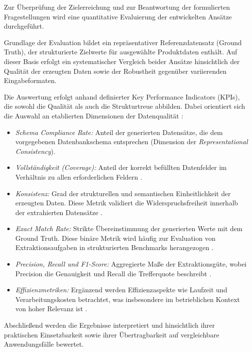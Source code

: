 Zur Überprüfung der Zielerreichung und zur Beantwortung der formulierten Fragestellungen wird eine quantitative Evaluierung der entwickelten Ansätze durchgeführt. 

Grundlage der Evaluation bildet ein repräsentativer Referenzdatensatz (Ground Truth), der strukturierte Zielwerte für ausgewählte Produktdaten enthält. Auf dieser Basis erfolgt 
ein systematischer Vergleich beider Ansätze hinsichtlich der Qualität der erzeugten Daten sowie der Robustheit gegenüber variierenden Eingabeformaten.

Die Auswertung erfolgt anhand definierter Key Performance Indicators (KPIs), die sowohl die Qualität als auch die Strukturtreue abbilden. Dabei orientiert sich die Auswahl an 
etablierten Dimensionen der Datenqualität \parencite[vgl.][S. 5--33]{wang1996beyond}:

\begin{itemize}
    \item \textit{Schema Compliance Rate:} Anteil der generierten Datensätze, die dem vorgegebenen Datenbankschema entsprechen (Dimension der 
    \textit{Representational Consistency}).
    \item \textit{Vollständigkeit (Coverage):} Anteil der korrekt befüllten Datenfelder im Verhältnis zu allen erforderlichen Feldern 
    \parencite[Dimension der \textit{Completeness}, vgl.][S. 24]{batini2016data}.
    \item \textit{Konsistenz:} Grad der strukturellen und semantischen Einheitlichkeit der erzeugten Daten. Diese Metrik validiert die Widerspruchsfreiheit innerhalb der 
    extrahierten Datensätze \parencite[vgl.][S. 31]{batini2016data}.
    \item \textit{Exact Match Rate:} Strikte Übereinstimmung der generierten Werte mit dem Ground Truth. Diese binäre Metrik wird häufig zur Evaluation von Extraktionsaufgaben 
    in strukturierten Benchmarks herangezogen \parencite[vgl.][S. 1283]{data_extraction_ai}.
    \item \textit{Precision, Recall und F1-Score:} Aggregierte Maße der Extraktionsgüte, wobei Precision die Genauigkeit und Recall die Trefferquote beschreibt 
    \parencite[vgl.][S. 67f.]{data_extraction_ai}.
    \item \textit{Effizienzmetriken:} Ergänzend werden Effizienzaspekte wie Laufzeit und Verarbeitungskosten betrachtet, was insbesondere im betrieblichen Kontext von hoher 
    Relevanz ist \parencite[vgl.][S. 3]{ferrara2014web}.
\end{itemize}

Abschließend werden die Ergebnisse interpretiert und hinsichtlich ihrer praktischen Einsetzbarkeit sowie ihrer Übertragbarkeit auf vergleichbare Anwendungsfälle bewertet.